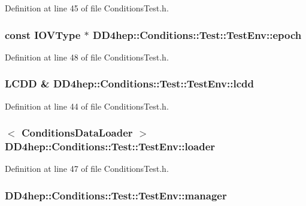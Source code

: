 Definition at line 45 of file ConditionsTest.h.\hypertarget{struct_d_d4hep_1_1_conditions_1_1_test_1_1_test_env_a71fce3b33ebcdf5f35f433f88e6ab9d6}{
\subsubsection[{epoch}]{\setlength{\rightskip}{0pt plus 5cm}const {\bf IOVType} $\ast$ {\bf DD4hep::Conditions::Test::TestEnv::epoch}}}
\label{struct_d_d4hep_1_1_conditions_1_1_test_1_1_test_env_a71fce3b33ebcdf5f35f433f88e6ab9d6}


Definition at line 48 of file ConditionsTest.h.\hypertarget{struct_d_d4hep_1_1_conditions_1_1_test_1_1_test_env_a6939ff406dbff1ad30aa6ce492dc3ebf}{
\subsubsection[{lcdd}]{\setlength{\rightskip}{0pt plus 5cm}LCDD \& {\bf DD4hep::Conditions::Test::TestEnv::lcdd}}}
\label{struct_d_d4hep_1_1_conditions_1_1_test_1_1_test_env_a6939ff406dbff1ad30aa6ce492dc3ebf}


Definition at line 44 of file ConditionsTest.h.\hypertarget{struct_d_d4hep_1_1_conditions_1_1_test_1_1_test_env_acf0847e9018a0793ef805d2a16b033a5}{
\subsubsection[{loader}]{$<$ {\bf ConditionsDataLoader} $>$ {\bf DD4hep::Conditions::Test::TestEnv::loader}}}
\label{struct_d_d4hep_1_1_conditions_1_1_test_1_1_test_env_acf0847e9018a0793ef805d2a16b033a5}


Definition at line 47 of file ConditionsTest.h.\hypertarget{struct_d_d4hep_1_1_conditions_1_1_test_1_1_test_env_aadbe3c1f12fe6972edbf18f58359a107}{
\subsubsection[{manager}]{ {\bf DD4hep::Conditions::Test::TestEnv::manager}}}
\label{struct_d_d4hep_1_1_conditions_1_1_test_1_1_test_env_aadbe3c1f12fe6972edbf18f58359a107}


